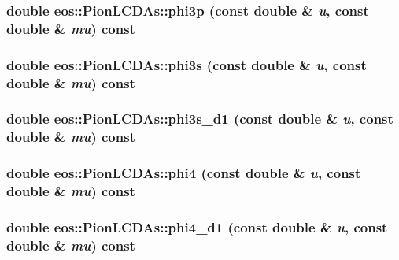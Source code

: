 \label{classeos_1_1PionLCDAs_a25af0e77528227031bdba7c630246c3a}
\hypertarget{classeos_1_1PionLCDAs_ac0f6b8d17ffe7b7e6f4ffcfa46e1d353}{
\subsubsection[{phi3p}]{\setlength{\rightskip}{0pt plus 5cm}double eos::PionLCDAs::phi3p (const double \& {\em u}, \/  const double \& {\em mu}) const}}
\label{classeos_1_1PionLCDAs_ac0f6b8d17ffe7b7e6f4ffcfa46e1d353}
\hypertarget{classeos_1_1PionLCDAs_a41fcd9e04a0f84c01b2168c7fba13164}{
\subsubsection[{phi3s}]{\setlength{\rightskip}{0pt plus 5cm}double eos::PionLCDAs::phi3s (const double \& {\em u}, \/  const double \& {\em mu}) const}}
\label{classeos_1_1PionLCDAs_a41fcd9e04a0f84c01b2168c7fba13164}
\hypertarget{classeos_1_1PionLCDAs_a821f18698397f85d42746ffeb7086ffa}{
\subsubsection[{phi3s\_\-d1}]{\setlength{\rightskip}{0pt plus 5cm}double eos::PionLCDAs::phi3s\_\-d1 (const double \& {\em u}, \/  const double \& {\em mu}) const}}
\label{classeos_1_1PionLCDAs_a821f18698397f85d42746ffeb7086ffa}
\hypertarget{classeos_1_1PionLCDAs_a0a4f734894305e27fbcab789f9d61510}{
\subsubsection[{phi4}]{\setlength{\rightskip}{0pt plus 5cm}double eos::PionLCDAs::phi4 (const double \& {\em u}, \/  const double \& {\em mu}) const}}
\label{classeos_1_1PionLCDAs_a0a4f734894305e27fbcab789f9d61510}
\hypertarget{classeos_1_1PionLCDAs_acb4c831f65e2758d01263b7b4a121e7c}{
\subsubsection[{phi4\_\-d1}]{\setlength{\rightskip}{0pt plus 5cm}double eos::PionLCDAs::phi4\_\-d1 (const double \& {\em u}, \/  const double \& {\em mu}) const}}

